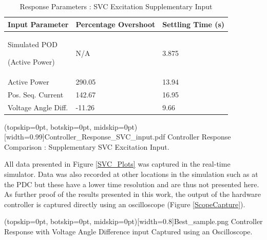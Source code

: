 \documentclass{ieeeaccess}
\begin{document}
\begin{table}[htb]
\caption{Response Parameters : SVC Excitation Supplementary Input}\label{SVCResponseTable}

\begin{center}
\begin{tabular}{|p{80pt}|p{60pt}|p{60pt}|}

\hline \textbf{Input Parameter} & \textbf{Percentage Overshoot} & \textbf{Settling Time (s)} \\
\hline Simulated POD \par (Active Power)& N/A & 3.875 \\ 
\hline Active Power & 290.05 & 13.94 \\ 
\hline Pos. Seq. Current & 142.67 & 16.95\\ 
\hline Voltage Angle Diff. & -11.26 & 9.66\\ 
\hline 

\end{tabular}

\end{center}

\end{table}  

\Figure[tbp!](topskip=0pt, botskip=0pt, midskip=0pt)[width=0.99\columnwidth]{Controller_Response_SVC_input.pdf}
{Controller Response Comparison : Supplementary SVC Excitation Input.\label{SVC_Plots}}

All data presented in Figure \ref{SVC_Plots} was captured in the real-time simulator. Data was also recorded at other locations in the simulation such as at the PDC but these have a lower time resolution and are thus not presented here. As further proof of the results presented in this work, the output of the hardware controller is captured directly using an oscilloscope (Figure \ref{ScopeCapture}).

\Figure[tbp!](topskip=0pt, botskip=0pt, midskip=0pt)[width=0.8\columnwidth]{Best_sample.png}
{Controller Response with Voltage Angle Difference input Captured using an Oscilloscope.\label{ScopeCapture}}
\end{document}
